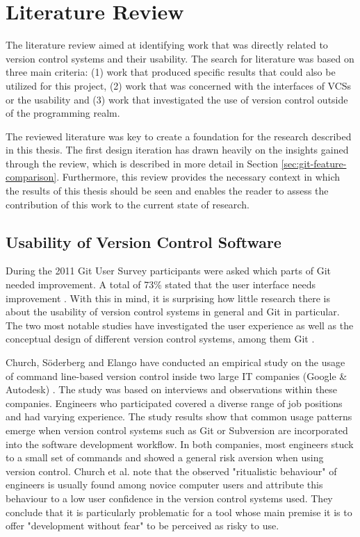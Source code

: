 \chapter{Literature Review} \label{chapter:related-work}
The literature review aimed at identifying work that was directly related to version control systems and their usability. The search for literature was based on three main criteria: (1) work that produced specific results that could also be utilized for this project, (2) work that was concerned with the interfaces of VCSs or the usability and (3) work that investigated the use of version control outside of the programming realm.

The reviewed literature was key to create a foundation for the research described in this thesis. The first design iteration has drawn heavily on the insights gained through the review, which is described in more detail in Section \ref{sec:git-feature-comparison}. Furthermore, this review provides the necessary context in which the results of this thesis should be seen and enables the reader to assess the contribution of this work to the current state of research.

\section{Usability of Version Control Software}
During the 2011 Git User Survey participants were asked which parts of Git needed improvement. A total of 73\% stated that  the user interface needs improvement \cite{_git_2011}. With this in mind, it is surprising how little research there is about the usability of version control systems in general and Git in particular. The two most notable studies have investigated the user experience as well as the conceptual design of different version control systems, among them Git \cite{church_case_2014,perez_de_rosso_whats_2013}.

Church, Söderberg and Elango have conducted an empirical study on the usage of command line-based version control inside two large IT companies (Google \& Autodesk) \cite{church_case_2014}. The study was based on interviews and observations within these companies. Engineers who participated covered a diverse range of job positions and had varying experience. The study results show that common usage patterns emerge when version control systems such as Git or Subversion are incorporated into the software development workflow. In both companies, most engineers stuck to a small set of commands and showed a general risk aversion when using version control. Church et al. note that the observed "ritualistic behaviour" of engineers is usually found among novice computer users and attribute this behaviour to a low user confidence in the version control systems used. They conclude that it is particularly problematic for a tool whose main premise it is to offer "development without fear" to be perceived as risky to use.

